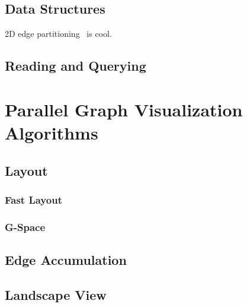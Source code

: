 \documentclass[pdf,12pt,report,strict]{SANDreport}
\newcommand*{\lcite}[1]{~\cite{#1}}
\begin{document}
\section{Data Structures}
\label{sec:ParallelGraphVisualizationFramework:DataStructures}



2D edge partitioning\lcite{Yoo05} is cool.


\section{Reading and Querying}
\label{sec:ParallelGraphVisualizationFramework:ReadingAndQuerying}


\chapter{Parallel Graph Visualization Algorithms}
\label{chap:ParallelGraphVisualizationAlgorithms}

\section{Layout}
\label{sec:Layout}

\subsection{Fast Layout}
\label{sec:Layout:FastLayout}

\subsection{G-Space}
\label{sec:Layout:GSpace}

\section{Edge Accumulation}
\label{sec:EdgeAccumulation}

\section{Landscape View}
\label{sec:LandscapeView}
\end{document}
